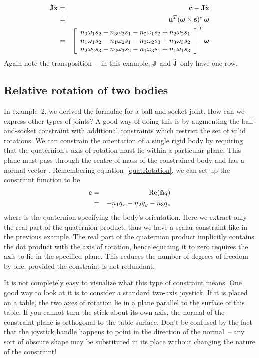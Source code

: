 \begin{eqnarray}
\dot{\m{J}}\dot{\ve{x}} & = & \ddot{\ve{c}} - \m{J}\ddot{\ve{x}} \nonumber\\
&=& -\ve{n}^T \dual{(\ve{\omega}\times\ve{s})}\,\ve{\omega} \nonumber\\
&=& \left[\begin{array}{c}
    n_3 \omega_1 s_2 - n_3 \omega_2 s_1 - n_2 \omega_1 s_2 + n_2 \omega_2 s_1 \\
    n_1 \omega_1 s_2 - n_1 \omega_2 s_1 - n_3 \omega_2 s_3 + n_3 \omega_3 s_2 \\
    n_2 \omega_2 s_3 - n_2 \omega_3 s_2 - n_1 \omega_3 s_1 + n_1 \omega_1 s_3
    \end{array}\right]^T \ve{\omega}
\end{eqnarray}
Again note the transposition~-- in this example, $\m{J}$ and $\dot{\m{J}}$ only
have one row.

\subsection{Relative rotation of two bodies}

In example~2, we derived the formulae for a ball-and-socket joint. How can we express other types
of joints? A good way of doing this is by augmenting the ball-and-socket constraint with
additional constraints which restrict the set of valid rotations. We can constrain the orientation
of a single rigid body by requiring that the quaternion's axis of rotation must lie within a
particular plane. This plane must pass through the centre of mass of the constrained body and
has a normal vector . Remembering equation~\ref{quatRotation}, we can set up the
constraint function to be
\begin{eqnarray}
\label{constrEx4C}
\ve{c} & = & \mathrm{Re}(\tilde{\ve{n}}\q{q}) \\
& = & - n_1 q_x - n_2 q_y - n_3 q_z \nonumber
\end{eqnarray}
where  is the quaternion specifying the body's orientation. Here we extract only the
real part of the quaternion product, thus we have a scalar constraint like in the previous
example. The real part of the quaternion product implicitly contains the dot product with the
axis of rotation, hence equating it to zero requires the axis to lie in the specified plane.
This reduces the number of degrees of freedom by one, provided the constraint is not redundant.

It is not completely easy to visualize what this type of constraint means. One good way to look
at it is to consider a standard two-axis joystick. If it is placed on a table, the two axes of
rotation lie in a plane parallel to the surface of this table. If you cannot turn the stick about
its own axis, the normal of the constraint plane is orthogonal to the table surface.
Don't be confused by the fact that the joystick handle happens to point in the direction of the
normal~-- any sort of obscure shape may be substituted in its place without changing the nature
of the constraint!


